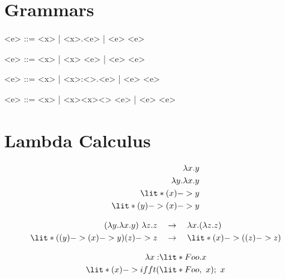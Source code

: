 \documentclass[11hpt]{article}
\begin{document}
\section{Grammars}

\begin{grammar}
<e> ::= <x> | <\lambda x>.<e> | <e> <e>
\end{grammar}

\begin{grammar}
<e> ::= <x> | \lit*{(}<x>\lit*{) ->} <e> | <e> <e>
\end{grammar}

\begin{grammar}
<e> ::= <x> | <\lambda x>:<\tau>.<e> | <e> <e>
\end{grammar}

\begin{grammar}
<e> ::= <x> | \lit*{(}<x><x>\lit*{,}<\tau>\lit*{);} <e> | <e> <e>
\end{grammar}

\section{Lambda Calculus}

\begin{align*}
\lambda x.y \\
\lambda y.\lambda x.y \\
\lit*{(x) -> y} \\
\lit*{(y) -> (x) -> y}
\end{align*}

\begin{align*}
(\lambda y.\lambda x.y) \ \lambda z.z \quad &\rightarrow \quad \lambda x.(\lambda z.z) \\
\lit*{((y) -> (x) -> y) (z) -> z} \quad &\rightarrow \quad \lit*{(x) -> ((z) -> z)}
\end{align*}

\begin{align*}
\lambda x:&\lit*{Foo}.x \\
\lit*{(x) -> ifft(}&\lit*{Foo,\ x); \ x} \\
\end{align*}
\end{document}
